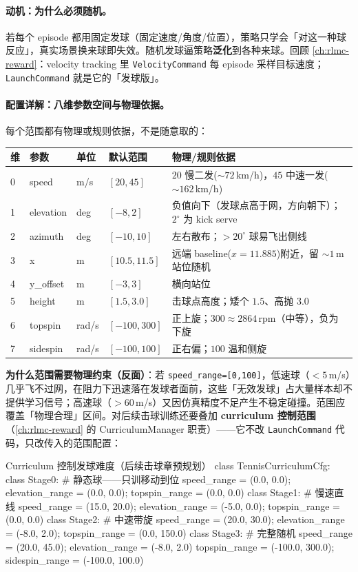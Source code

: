\paragraph{动机：为什么必须随机。}若每个 episode 都用固定发球（固定速度/角度/位置），策略只学会「对这一种球反应」，真实场景换来球即失效。随机发球逼策略\textbf{泛化}到各种来球。回顾 \cref{ch:rlmc-reward}：velocity tracking 里 \verb|VelocityCommand| 每 episode 采样目标速度；\verb|LaunchCommand| 就是它的「发球版」。

\paragraph{配置详解：八维参数空间与物理依据。}每个范围都有物理或规则依据，不是随意取的：

\begin{center}
\small
\begin{tabular}{@{}llllp{4.0cm}@{}}
\toprule
维 & 参数 & 单位 & 默认范围 & 物理/规则依据 \\
\midrule
0 & speed & m/s & $[20,45]$ & $20$ 慢二发($\sim72$\,km/h)，$45$ 中速一发($\sim162$\,km/h) \\
1 & elevation & deg & $[-8,2]$ & 负值向下（发球点高于网，方向朝下）；$2^\circ$ 为 kick serve \\
2 & azimuth & deg & $[-10,10]$ & 左右散布；$>20^\circ$ 球易飞出侧线 \\
3 & x & m & $[10.5,11.5]$ & 远端 baseline($x=11.885$)附近，留 $\sim1$\,m 站位随机 \\
4 & y\_offset & m & $[-3,3]$ & 横向站位 \\
5 & height & m & $[1.5,3.0]$ & 击球点高度；矮个 $1.5$、高抛 $3.0$ \\
6 & topspin & rad/s & $[-100,300]$ & 正上旋；$300\approx2864$\,rpm（中等），负为下旋 \\
7 & sidespin & rad/s & $[-100,100]$ & 正右偏；$100$ 温和侧旋 \\
\bottomrule
\end{tabular}
\end{center}

\textbf{为什么范围需要物理约束（反面）}：若 \verb|speed_range=[0,100]|，低速球（$<5$\,m/s）几乎飞不过网，在阻力下迅速落在发球者面前，这些「无效发球」占大量样本却不提供学习信号；高速球（$>60$\,m/s）又因仿真精度不足产生不稳定碰撞。范围应覆盖「物理合理」区间。对后续击球训练还要叠加 \textbf{curriculum 控制范围}（\cref{ch:rlmc-reward} 的 CurriculumManager 职责）——它不改 \verb|LaunchCommand| 代码，只改传入的范围配置：

\begin{codebox}[Python]{Curriculum 控制发球难度（后续击球章预规划）}
class TennisCurriculumCfg:
    class Stage0:  # 静态球——只训移动到位
        speed_range = (0.0, 0.0); elevation_range = (0.0, 0.0); topspin_range = (0.0, 0.0)
    class Stage1:  # 慢速直线
        speed_range = (15.0, 20.0); elevation_range = (-5.0, 0.0); topspin_range = (0.0, 0.0)
    class Stage2:  # 中速带旋
        speed_range = (20.0, 30.0); elevation_range = (-8.0, 2.0); topspin_range = (0.0, 150.0)
    class Stage3:  # 完整随机
        speed_range = (20.0, 45.0); elevation_range = (-8.0, 2.0)
        topspin_range = (-100.0, 300.0); sidespin_range = (-100.0, 100.0)
\end{codebox}


